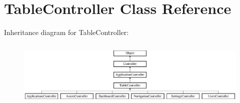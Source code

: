 \hypertarget{class_table_controller}{
\section{TableController Class Reference}
\label{class_table_controller}
}
Inheritance diagram for TableController:\begin{figure}[H]
\begin{center}
\leavevmode
\includegraphics[height=3.218391cm]{class_table_controller}
\end{center}
\end{figure}
